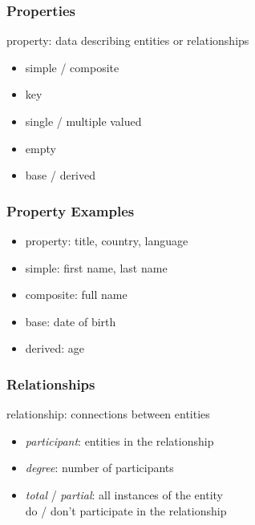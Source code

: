 \documentclass[dvipsnames]{beamer}
\begin{document}
\begin{frame}
  \frametitle{Properties}

  \begin{definition}
    \alert{property}: data describing entities or relationships

    \pause
    \begin{itemize}
      \item simple / composite
      \item key
      \item single / multiple valued
      \item empty
      \item base / derived
    \end{itemize}
  \end{definition}
\end{frame}

\begin{frame}
  \frametitle{Property Examples}

  \begin{example}
    \begin{itemize}
      \item property: title, country, language

      \pause
      \medskip
      \item simple: first name, last name
      \item composite: full name

      \pause
      \medskip
      \item base: date of birth
      \item derived: age
    \end{itemize}
  \end{example}
\end{frame}

\begin{frame}
  \frametitle{Relationships}

  \begin{definition}
    \alert{relationship}: connections between entities

    \pause
    \begin{itemize}
      \item \emph{participant}: entities in the relationship
      \item \emph{degree}: number of participants
      \item \emph{total} / \emph{partial}: all instances of the entity\\
        do / don't participate in the relationship
    \end{itemize}
  \end{definition}
\end{frame}
\end{document}
